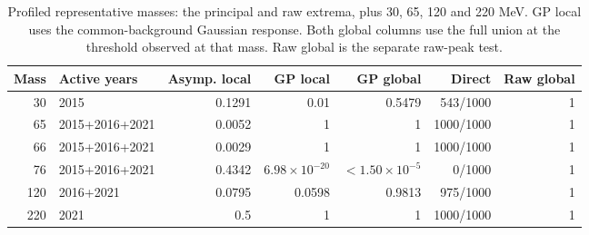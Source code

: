 \begin{table}[H]\centering\small
\begin{tabular}{rlrrrrr}\toprule
Mass & Active years & Asymp. local & GP local & GP global & Direct & Raw global\\\midrule
30 & 2015 & 0.1291 & 0.01 & 0.5479 & 543/1000 & 1 \\
65 & 2015+2016+2021 & 0.0052 & 1 & 1 & 1000/1000 & 1 \\
66 & 2015+2016+2021 & 0.0029 & 1 & 1 & 1000/1000 & 1 \\
76 & 2015+2016+2021 & 0.4342 & $6.98\times10^{-20}$ & $<$$1.50\times10^{-5}$ & 0/1000 & 1 \\
120 & 2016+2021 & 0.0795 & 0.0598 & 0.9813 & 975/1000 & 1 \\
220 & 2021 & 0.5 & 1 & 1 & 1000/1000 & 1 \\
\bottomrule\end{tabular}
\caption{Profiled representative masses: the principal and raw extrema, plus 30, 65, 120 and 220 MeV. GP local uses the common-background Gaussian response. Both global columns use the full union at the threshold observed at that mass. Raw global is the separate raw-peak test.}\end{table}

